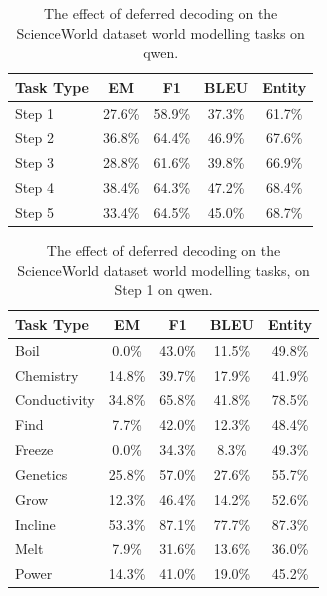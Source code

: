 \begin{table}[h]
\centering
    \setlength\tabcolsep{15pt}
    \setlength\extrarowheight{0pt}
\caption{The effect of deferred decoding on the ScienceWorld dataset \citep{wang-etal-2022-scienceworld} world modelling tasks on qwen.}
\label{tab:scienceworld35}
\begin{tabular}{lcccc}
\toprule
\textbf{Task Type} & \textbf{EM} & \textbf{F1}
  & \textbf{BLEU} & \textbf{Entity}\\
\midrule
Step 1 & 27.6\% & 58.9\% & 37.3\% & 61.7\% \\
Step 2 & 36.8\% & 64.4\% & 46.9\% & 67.6\% \\
Step 3 & 28.8\% & 61.6\% & 39.8\% & 66.9\% \\
Step 4 & 38.4\% & 64.3\% & 47.2\% & 68.4\% \\
Step 5 & 33.4\% & 64.5\% & 45.0\% & 68.7\% \\

\bottomrule
\end{tabular}
\end{table}

\begin{table}[h]
\centering
    \setlength\tabcolsep{15pt}
    \setlength\extrarowheight{0pt}
\caption{The effect of deferred decoding on the ScienceWorld dataset \citep{wang-etal-2022-scienceworld} world modelling tasks, on Step 1 on qwen.}
\label{tab:scienceworld36}
\begin{tabular}{lcccc}
\toprule
\textbf{Task Type} & \textbf{EM} & \textbf{F1}
  & \textbf{BLEU} & \textbf{Entity}\\
\midrule
Boil & 0.0\% & 43.0\% & 11.5\% & 49.8\% \\
Chemistry & 14.8\% & 39.7\% & 17.9\% & 41.9\% \\
Conductivity & 34.8\% & 65.8\% & 41.8\% & 78.5\% \\
Find & 7.7\% & 42.0\% & 12.3\% & 48.4\% \\
Freeze & 0.0\% & 34.3\% & 8.3\% & 49.3\% \\
Genetics & 25.8\% & 57.0\% & 27.6\% & 55.7\% \\
Grow & 12.3\% & 46.4\% & 14.2\% & 52.6\% \\
Incline & 53.3\% & 87.1\% & 77.7\% & 87.3\% \\
Melt & 7.9\% & 31.6\% & 13.6\% & 36.0\% \\
Power & 14.3\% & 41.0\% & 19.0\% & 45.2\% \\

\bottomrule
\end{tabular}
\end{table}

